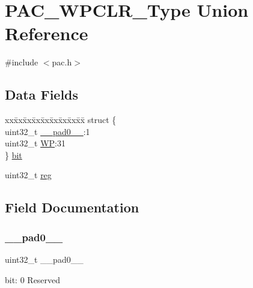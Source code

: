 \hypertarget{union_p_a_c___w_p_c_l_r___type}{}\section{P\+A\+C\+\_\+\+W\+P\+C\+L\+R\+\_\+\+Type Union Reference}
\label{union_p_a_c___w_p_c_l_r___type}


{\ttfamily \#include $<$pac.\+h$>$}

\subsection*{Data Fields}
\begin{DoxyCompactItemize}
\item 
\begin{tabbing}
xx\=xx\=xx\=xx\=xx\=xx\=xx\=xx\=xx\=\kill
struct \{\\
\>uint32\_t \mbox{\hyperlink{union_p_a_c___w_p_c_l_r___type_a3e57c2ef1c3ffb36722f000cc1156824}{\_\_pad0\_\_}}:1\\
\>uint32\_t \mbox{\hyperlink{union_p_a_c___w_p_c_l_r___type_a086f0495fbde459e38572b5adcfae92b}{WP}}:31\\
\} \mbox{\hyperlink{union_p_a_c___w_p_c_l_r___type_aa9bad78f77f8394f2b365ba1216eab45}{bit}}\\

\end{tabbing}\item 
uint32\+\_\+t \mbox{\hyperlink{union_p_a_c___w_p_c_l_r___type_a6b91636401516a477989a336376d7b40}{reg}}
\end{DoxyCompactItemize}


\subsection{Field Documentation}
\mbox{\label{union_p_a_c___w_p_c_l_r___type_a3e57c2ef1c3ffb36722f000cc1156824}} 
\subsubsection{\texorpdfstring{\_\_pad0\_\_}{\_\_pad0\_\_}}
{\footnotesize\ttfamily uint32\+\_\+t \+\_\+\+\_\+pad0\+\_\+\+\_\+}

bit\+: 0 Reserved \mbox{\label{union_p_a_c___w_p_c_l_r___type_aa9bad78f77f8394f2b365ba1216eab45}} 
